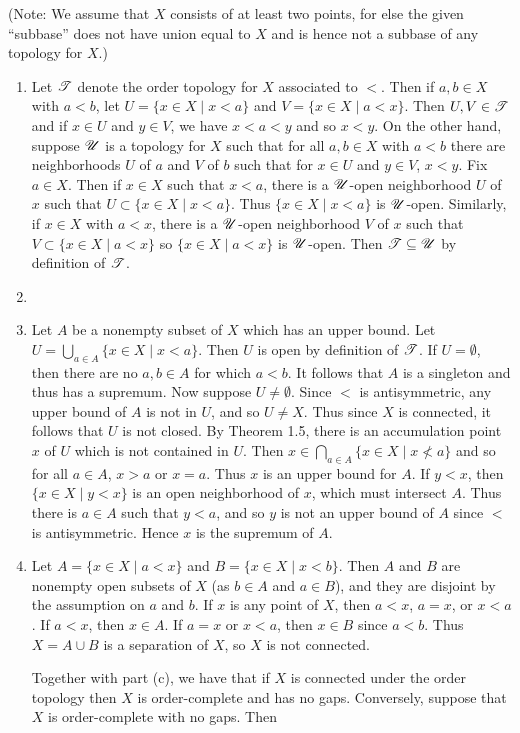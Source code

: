 \begin{prob}
(Note: We assume that $X$ consists of at least two points, for else the given ``subbase'' does not have union equal to $X$ and is hence not a subbase of any topology for $X$.)
\begin{enumerate}
\item Let $\mathscr{T}$ denote the order topology for $X$ associated to $<$. Then if $a, b \in X$ with $a < b$, let $U = \{x \in X\mid x < a\}$ and $V = \{x \in X\mid a < x\}$. Then $U, V \in \mathscr{T}$ and if $x \in U$ and $y \in V$, we have $x < a < y$ and so $x < y$. On the other hand, suppose $\mathscr{U}$ is a topology for $X$ such that for all $a, b \in X$ with $a < b$ there are neighborhoods $U$ of $a$ and $V$ of $b$ such that for $x \in U$ and $y \in V$, $x < y$. Fix $a \in X$. Then if $x \in X$ such that $x < a$, there is a $\mathscr{U}$-open neighborhood $U$ of $x$ such that $U \subset \{x \in X\mid x < a\}$. Thus $\{x \in X\mid x < a\}$ is $\mathscr{U}$-open. Similarly, if $x \in X$ with $a < x$, there is a $\mathscr{U}$-open neighborhood $V$ of $x$ such that $V \subset \{x \in X\mid a < x\}$ so $\{x \in X\mid a < x\}$ is $\mathscr{U}$-open. Then $\mathscr{T} \subseteq \mathscr{U}$ by definition of $\mathscr{T}$.

\item 

\item Let $A$ be a nonempty subset of $X$ which has an upper bound. Let $U = \bigcup_{a \in A}\{x \in X\mid x < a\}$. Then $U$ is open by definition of $\mathscr{T}$. If $U = \emptyset$, then there are no $a, b \in A$ for which $a < b$. It follows that $A$ is a singleton and thus has a supremum. Now suppose $U \not = \emptyset$. Since $<$ is antisymmetric, any upper bound of $A$ is not in $U$, and so $U \not = X$. Thus since $X$ is connected, it follows that $U$ is not closed. By Theorem 1.5, there is an accumulation point $x$ of $U$ which is not contained in $U$. Then $x \in \bigcap_{a \in A}\{x \in X\mid x\not < a\}$ and so for all $a \in A$, $x > a$ or $x = a$. Thus $x$ is an upper bound for $A$. If $y < x$, then $\{x \in X\mid y < x\}$ is an open neighborhood of $x$, which must intersect $A$. Thus there is $a \in A$ such that $y < a$, and so $y$ is not an upper bound of $A$ since $<$ is antisymmetric. Hence $x$ is the supremum of $A$.

\item Let $A = \{x \in X\mid a < x\}$ and $B = \{x \in X\mid x < b\}$. Then $A$ and $B$ are nonempty open subsets of $X$ (as $b \in A$ and $a \in B$), and they are disjoint by the assumption on $a$ and $b$. If $x$ is any point of $X$, then $a < x$, $a = x$, or $x < a$. If $a < x$, then $x \in A$. If $a = x$ or $x < a$, then $x \in B$ since $a < b$. Thus $X = A\cup B$ is a separation of $X$, so $X$ is not connected.

Together with part (c), we have that if $X$ is connected under the order topology then $X$ is order-complete and has no gaps. Conversely, suppose that $X$ is order-complete with no gaps. Then 
\end{enumerate}
\end{prob}

